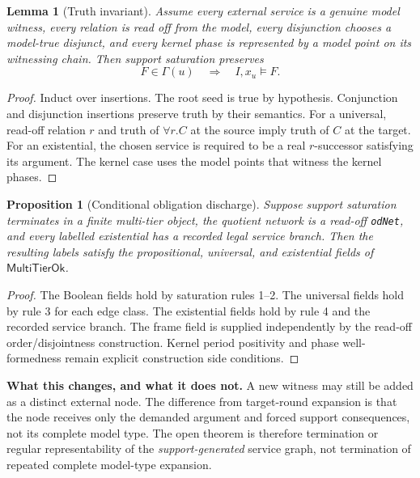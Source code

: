 \documentclass[11pt,letterpaper]{article}
\newcommand{\sat}{\models}
\newcommand{\MultiTierOk}{\ensuremath{\mathsf{MultiTierOk}}}
\newcommand{\code}[1]{\nolinkurl{#1}}
\theoremstyle{definition}
\theoremstyle{plain}
\newtheorem{lemma}[definition]{Lemma}
\newtheorem{proposition}[definition]{Proposition}
\theoremstyle{remark}
\begin{document}
\begin{lemma}[Truth invariant]\label{lem:truth-invariant}
Assume every external service is a genuine model witness, every relation is
read off from the model, every disjunction chooses a model-true disjunct, and
every kernel phase is represented by a model point on its witnessing chain.
Then support saturation preserves
\[
   F\in\Gamma(u) \quad\Longrightarrow\quad I,x_u\sat F.
\]
\end{lemma}

\begin{proof}
Induct over insertions.  The root seed is true by hypothesis.  Conjunction and
disjunction insertions preserve truth by their semantics.  For a universal,
read-off relation $r$ and truth of $\forall r.C$ at the source imply truth of
$C$ at the target.  For an existential, the chosen service is required to be a
real $r$-successor satisfying its argument.  The kernel case uses the model
points that witness the kernel phases.
\end{proof}

\begin{proposition}[Conditional obligation discharge]\label{prop:conditional-ok}
Suppose support saturation terminates in a finite multi-tier object, the
quotient network is a read-off \code{odNet}, and every labelled existential has
a recorded legal service branch.  Then the resulting labels satisfy the
propositional, universal, and existential fields of \MultiTierOk{}.
\end{proposition}

\begin{proof}
The Boolean fields hold by saturation rules 1--2.  The universal fields hold by
rule 3 for each edge class.  The existential fields hold by rule 4 and the
recorded service branch.  The frame field is supplied independently by the
read-off order/disjointness construction.  Kernel period positivity and phase
well-formedness remain explicit construction side conditions.
\end{proof}

\begin{cautionbox}
\textbf{What this changes, and what it does not.}
A new witness may still be added as a distinct external node.  The difference
from target-round expansion is that the node receives only the demanded
argument and forced support consequences, not its complete model type.  The
open theorem is therefore termination or regular representability of the
\emph{support-generated} service graph, not termination of repeated complete
model-type expansion.
\end{cautionbox}
\end{document}
